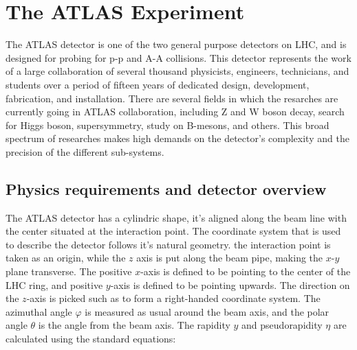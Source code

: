 \chapter{The ATLAS Experiment}
\label{sec:ATLAS}

The ATLAS detector is one of the two general purpose detectors on LHC, and is designed for probing for p-p and A-A collisions.
This detector represents the work of a large collaboration of several thousand physicists, engineers, technicians,
and students over a period of fifteen years of dedicated design, development, fabrication, and installation.
There are several fields in which the resarches are currently going in ATLAS collaboration, including Z and W boson decay, search for Higgs boson,
supersymmetry, study on B-mesons, and others. This broad spectrum of researches makes high demands on the detector's complexity and the precision 
of the different sub-systems.

\section{Physics requirements and detector overview}
\label{sec:ATLAS_overview}
The ATLAS detector has a cylindric shape, it's aligned along the beam line with the center situated at the interaction point.
The coordinate system that is used to describe the detector follows it's natural geometry. the interaction point is taken as an origin,
while the $z$ axis is put along the beam pipe, making the $x$-$y$ plane transverse. The positive $x$-axis is defined to be pointing to the center
of the LHC ring, and positive $y$-axis is defined to be pointing upwards. The direction on the $z$-axis is picked such as to form a right-handed coordinate system.
The azimuthal angle $\varphi$ is measured as usual around the beam axis, and the polar angle $\theta$ is the angle from the beam axis. The rapidity $y$ and pseudorapidity $\eta$
are calculated using the standard equations:



\begin{figure}[htb]
\end{figure}

